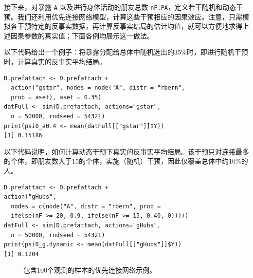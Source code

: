 接下来，对暴露 \texttt{A} 以及进行身体活动的朋友总数 \texttt{nF.PA}，定义若干随机和动态干预。我们还利用优先连接网络模型，计算这些干预相应的因果效应。注意，只需模拟各干预特定的反事实数据，再计算反事实结局的估计均值，就可以方便地求得上述因果参数的真实值；下面各例均展示这一做法。

以下代码给出一个例子：将暴露分配给总体中随机选出的35\%时，即进行随机干预时，计算真实的反事实平均结局。
\par\noindent\begin{minipage}{\linewidth}
\begin{lstlisting}[numbers=none,frame=none]
D.prefattach <- D.prefattach +
  action("gstar", nodes = node("A", distr = "rbern",
  prob = aset), aset = 0.35)
datFull <- sim(D.prefattach, actions="gstar",
  n = 50000, rndseed = 54321)
print(psi0_a0.4 <- mean(datFull[["gstar"]]$Y))
[1] 0.15186
\end{lstlisting}
\end{minipage}\par
以下代码说明，如何计算动态干预下真实的反事实平均结局。该干预只对连接最多的个体，即朋友数大于15的个体，实施（随机）干预，因此仅覆盖总体中约10\%的人。
\par\noindent\begin{minipage}{\linewidth}
\begin{lstlisting}[numbers=none,frame=none]
D.prefattach <- D.prefattach +
action("gHubs",
  nodes = c(node("A", distr = "rbern", prob =
  ifelse(nF >= 20, 0.9, ifelse(nF >= 15, 0.40, 0)))))
datFull <- sim(D.prefattach, actions="gHubs",
  n = 50000, rndseed = 54321)
print(psi0_g.dynamic <- mean(datFull[["gHubs"]]$Y))
[1] 0.1204
\end{lstlisting}
\end{minipage}\par

\begin{figure}[htbp]
 \centering
 
 \caption{包含100个观测的样本的优先连接网络示例。}
 \label{fig:ch21:network}
\end{figure}
\FloatBarrier
